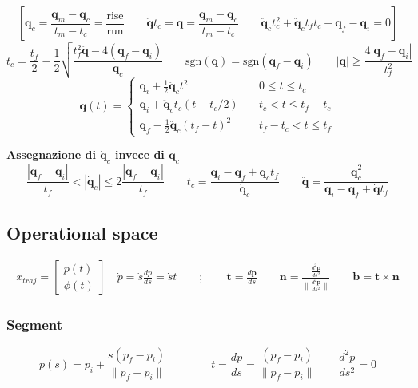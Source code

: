 $$
\left[
\bm{\dot{q}}_c 
= 
\frac{\bm{q}_m - \bm{q}_c}{t_m - t_c}
=
\frac{\text{rise}}{\text{run}}
\qquad
\bm{\ddot{q}}t_c
=
\bm{\dot{q}}
=
\frac{\bm{q}_m - \bm{q}_c}{t_m - t_c}
\qquad
\bm{\ddot{q}}_ct_c^2
+
\bm{\ddot{q}}_c t_f t_c
+
\bm{q}_f - \bm{q}_i = 0
\right]
$$
\vspace*{10pt}
$$
t_c
=
\frac{t_f}{2} - \frac{1}{2}
\sqrt{
	\frac{t_f^2 \ddot{\bm{q}} - 4(\bm{q}_f - \bm{q}_i)}{\bm{\ddot{q}}_c}
}
\qquad
\text{sgn}(\ddot{\bm{q}})
=
\text{sgn}(\bm{q}_f - \bm{q}_i)
\qquad
|\ddot{\bm{q}}| \ge \frac{4|\bm{q}_f - \bm{q}_i|}{t_f^2}
$$
\vspace*{10pt}
$$
\bm{q}(t)
=
\begin{cases}
	\bm{q}_i + \frac{1}{2} \ddot{\bm{q}}_c t^2 & \quad 0 \leq t \leq t_c \\
	\bm{q}_i + \ddot{\bm{q}}_c t_c (t - t_c/2) & \quad t_c < t \leq t_f - t_c \\
	\bm{q}_f - \frac{1}{2} \ddot{\bm{q}}_c (t_f - t)^2 & \quad t_f - t_c < t \leq t_f
\end{cases}
$$


\vspace*{10pt}
\textbf{Assegnazione di $\bm{\dot{q}}_c$ invece di $\bm{\ddot{q}}_c$}
\vspace*{5pt}
$$
\frac{|\bm{q}_f - \bm{q}_i|}{t_f}
<
|\bm{\dot{q}}_c|
\leq
2 \frac{|\bm{q}_f - \bm{q}_i|}{t_f}
\qquad
t_c = \frac{\bm{q}_i - \bm{q}_f + \bm{\dot{q}}_c t_f }{\dot{\bm{q}}_c}
\qquad
\bm{\ddot{q}}
=
\frac{\bm{\dot{q}}_c^2}{\bm{q}_i - \bm{q}_f + \bm{\dot{q}} t_f}
$$





\subsection{Operational space}
\begin{align*}
	x_{traj} = \begin{bmatrix}p(t) \\ \phi(t) \end{bmatrix}
	\quad
	\dot{p} = \dot{s} \frac{dp}{ds} = \dot{s}{t}
	\qquad ; \qquad
	\bm{t} = \frac{d\bm{p}}{ds}
	\qquad
	\bm{n} = \frac{\frac{d^2 \bm{p}}{ds^2}}{\| \frac{d^2 \bm{p}}{ds^2} \|}
	\qquad
	\bm{b} = \bm{t} \times \bm{n}
\end{align*}


\subsubsection{Segment}
$$
p(s) = p_i + \frac{s(p_f - p_i)}{\| p_f - p_i \|}
\qquad \qquad
t = \frac{dp}{ds} = \frac{(p_f - p_i)}{\| p_f - p_i \|}
\qquad
\frac{d^2p}{ds^2} = 0
$$

